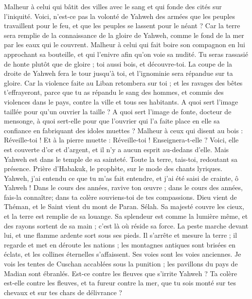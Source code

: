 \begin{multicols}{2}
Malheur à celui qui bâtit des villes avec le sang et qui fonde des cités sur l'iniquité.
Voici, n'est-ce pas la volonté de Yahweh des armées que les peuples travaillent pour le feu, et que les peuples se lassent pour le néant ?
Car la terre sera remplie de la connaissance de la gloire de Yahweh, comme le fond de la mer par les eaux qui le couvrent.
Malheur à celui qui fait boire son compagnon en lui approchant sa bouteille, et qui l’enivre afin qu'on voie sa nudité.
Tu seras rassasié de honte plutôt que de gloire ; toi aussi bois, et découvre-toi. La coupe de la droite de Yahweh fera le tour jusqu’à toi, et l'ignominie sera répandue sur ta gloire.
Car la violence faite au Liban retombera sur toi ; et les ravages des bêtes t’effrayeront, parce que tu as répandu le sang des hommes, et commis  des violences dans le pays, contre la ville et tous ses habitants.
A quoi sert l'image taillée  pour qu’un ouvrier la taille ? A quoi sert l’image de fonte, docteur de mensonge, à quoi sert-elle pour que l'ouvrier qui l’a faite place en elle sa confiance en fabriquant des idoles muettes ?
Malheur à ceux qui disent au bois : Réveille-toi ! Et à la pierre muette : Réveille-toi ! Enseignera-t-elle ? Voici, elle est couverte d'or et d'argent, et il n'y a aucun esprit au-dedans d’elle.
Mais Yahweh est dans le temple de sa sainteté. Toute la terre, tais-toi, redoutant sa présence.
\VerseOne{}Prière d'Habakuk, le prophète, sur le mode des chants lyriques.
Yahweh, j'ai entendu ce que tu m'as fait entendre, et j'ai été saisi de crainte, ô Yahweh ! Dans le cours des années, ravive ton œuvre ; dans le cours des années, fais-la connaître; dans ta colère souviens-toi de tes compassions.
Dieu vient de Théman, et le Saint vient du mont de Paran. Sélah. Sa majesté couvre les cieux, et la terre est remplie de sa louange.
Sa splendeur est comme la lumière même, et des rayons sortent de sa main ; c'est là où réside sa force.
La peste marche devant lui, et une  flamme ardente sort sous ses pieds.
Il s'arrête et mesure la terre ; il regarde et met en déroute les nations ; les montagnes antiques sont  brisées en éclats,  et les collines éternelles s’affaissent. Ses voies sont les voies anciennes.
Je vois les tentes de Cuschan accablées sous la punition ; les pavillons du pays de Madian sont ébranlés.
Est-ce contre les fleuves que s’irrite Yahweh ? Ta colère est-elle contre les fleuves, et ta fureur contre la mer, que tu sois monté sur tes chevaux et sur tes chars de délivrance ?

\end{multicols}
